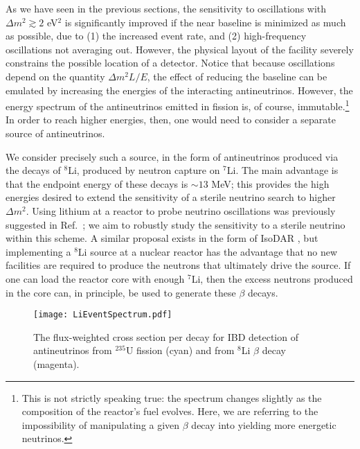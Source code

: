 \documentclass[prd, twocolumn, tightenlines, twoside, secnumarabic, superscriptaddress, preprintnumbers, nofootinbib, notitlepage]{revtex4-1}
\begin{document}
As we have seen in the previous sections, the sensitivity to oscillations with $\Delta m^2 \gtrsim 2$ eV$^2$ is significantly improved if the near baseline is minimized as much as possible, due to (1) the increased event rate, and (2) high-frequency oscillations not averaging out. However, the physical layout of the facility severely constrains the possible location of a detector.
Notice that because oscillations depend on the quantity $\Delta m^2 L/E$, the effect of reducing the baseline can be emulated by increasing the energies of the interacting antineutrinos. However, the energy spectrum of the antineutrinos emitted in fission is, of course, immutable.\footnote{This is not strictly speaking true: the spectrum changes slightly as the composition of the reactor's fuel evolves. Here, we are referring to the impossibility of manipulating a given $\beta$ decay into yielding more energetic neutrinos.} In order to reach higher energies, then, one would need to consider a separate source of antineutrinos.

We consider precisely such a source, in the form of antineutrinos produced via the decays of $^8$Li, produced by neutron capture on $^7$Li. The main advantage is that the endpoint energy of these decays is $\sim13$ MeV; this provides the high energies desired to extend the sensitivity of a sterile neutrino search to higher $\Delta m^2$.
Using lithium at a reactor to probe neutrino oscillations was previously suggested in Ref.~\cite{Lyashuk:2016lpn}; we aim to robustly study the sensitivity to a sterile neutrino within this scheme.
A similar proposal exists in the form of IsoDAR \cite{Conrad:2013sqa,Alonso:2017fci}, but implementing a $^8$Li source at a nuclear reactor has the advantage that no new facilities are required to produce the neutrons that ultimately drive the source. If one can load the reactor core with enough $^7$Li, then the excess neutrons produced in the core can, in principle, be used to generate these $\beta$ decays. 

\begin{figure}[t]
    \texttt{[image: LiEventSpectrum.pdf]}
    \caption{The flux-weighted cross section per decay for IBD detection of antineutrinos from $^{235}$U fission (cyan) and from $^8$Li $\beta$ decay (magenta). }
    \label{fig:lithium_spec}
\end{figure}
\end{document}
